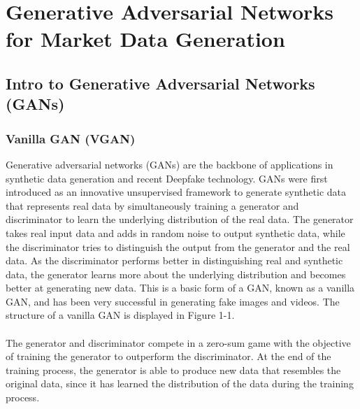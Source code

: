 \chapter{Generative Adversarial Networks for Market Data Generation}

\section{Intro to Generative Adversarial Networks (GANs)}
\subsection{Vanilla GAN (VGAN)}
Generative adversarial networks (GANs) are the backbone of applications in synthetic data generation and recent Deepfake technology. GANs were first introduced as an innovative unsupervised framework to generate synthetic data that represents real data by simultaneously training a generator and discriminator to learn the underlying distribution of the real data. The generator takes real input data and adds in random noise to output synthetic data, while the discriminator tries to distinguish the output from the generator and the real data. As the discriminator performs better in distinguishing real and synthetic data, the generator learns more about the underlying distribution and becomes better at generating new data. This is a basic form of a GAN, known as a vanilla GAN, and has been very successful in generating fake images and videos. The structure of a vanilla GAN is displayed in Figure 1-1.
\\
\\
The generator and discriminator compete in a zero-sum game with the objective of training the generator to outperform the discriminator. At the end of the training process, the generator is able to produce new data that resembles the original data, since it has learned the distribution of the data during the training process.
